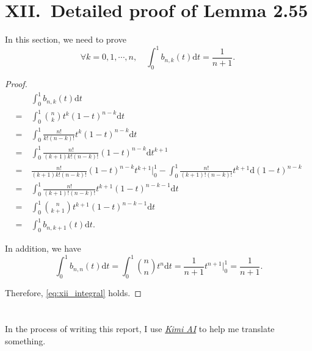 \documentclass[a4paper]{article}
\begin{document}
\section*{XII.\ Detailed proof of Lemma 2.55}

In this section, we need to prove
\begin{equation}
  \forall k = 0, 1, \cdots, n, \quad \int_{0}^{1} b_{n, k}(t) \mathrm{d}t = \frac{1}{n + 1}.\
  \label{eq:xii_integral} 
\end{equation}

\begin{proof}
  \begin{equation}
    \begin{aligned}
      & \int_{0}^{1} b_{n, k}(t) \mathrm{d}t \\
      =\ & \int_{0}^{1} \binom{n}{k} t^k (1 - t)^{n - k} \mathrm{d}t \\
      =\ & \int_{0}^{1} \frac{n!}{k!(n - k)!} t^k (1 - t)^{n - k} \mathrm{d}t \\
      =\ & \int_{0}^{1} \frac{n!}{(k + 1)k!(n - k)!} (1 - t)^{n - k} \mathrm{d} t^{k + 1} \\
      =\ & \frac{n!}{(k + 1)k!(n - k)!} (1 - t)^{n - k} t^{k + 1} \Big|_{0}^{1} - \int_{0}^{1} \frac{n!}{(k + 1)!(n - k)!} t^{k + 1} \mathrm{d} (1 - t)^{n - k} \\
      =\ & \int_{0}^{1} \frac{n!}{(k + 1)!(n - k)!} t^{k + 1} (1 - t)^{n - k - 1} \mathrm{d}t \\
      =\ & \int_{0}^{1} \binom{n}{k + 1} t^{k + 1} (1 - t)^{n - k - 1} \mathrm{d}t \\
      =\ & \int_{0}^{1} b_{n, k + 1}(t) \mathrm{d}t.
    \end{aligned}
    \label{eq:xii_integral_proof}
  \end{equation}

  In addition, we have 
  \begin{equation}
    \int_{0}^{1} b_{n, n}(t) \mathrm{d}t = \int_{0}^{1} \binom{n}{n} t^n \mathrm{d}t = \frac{1}{n + 1} t^{n + 1} \Big|_{0}^{1} = \frac{1}{n + 1}.
    \label{eq:xii_integral_n}
  \end{equation}

  Therefore, \cref{eq:xii_integral} holds.
\end{proof}

\section*{  }

In the process of writing this report, I use \href{https://kimi.moonshot.cn/}{\textit{Kimi AI}} to help me translate something.

\printbibliography
\end{document}
